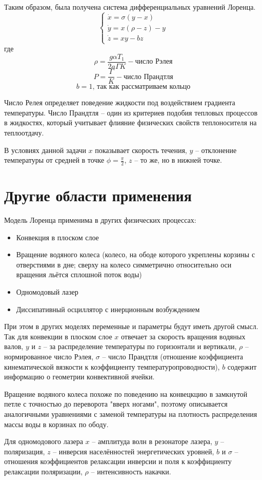 \documentclass[12pt]{article}
\begin{document}
Таким образом, была получена система дифференциальных уравнений Лоренца.
$$\begin{cases}	
	\dot{x} = \sigma (y-x) \\
	\dot{y} = x(\rho-z)-y \\
	\dot{z} = xy-bz
\end{cases}$$
где 
\[ \rho = \frac{g\alpha T_1}{2a\Gamma K} - \text{число Рэлея}\]
\[P = \frac{\Gamma}{K} - \text{число Прандтля}\] 
\[b = 1 \text{, так как рассматриваем кольцо}\]

Число Релея определяет поведение жидкости под воздействием градиента температуры. Число Прандтля -- один из критериев подобия тепловых процессов в жидкостях, который учитывает флияние физических свойств теплоносителя на теплоотдачу.

В условиях данной задачи $x$ показывает скорость течения, $y$ -- отклонение температуры от средней в точке $\phi = \frac{\pi}{2}$, $z$ -- то же, но в нижней точке.

\section{Другие области применения}

Модель Лоренца применима в других физических процессах:
\begin{itemize}
	\item Конвекция в плоском слое
	\item Вращение водяного колеса (колесо, на ободе которого укреплены корзины с отверстиями в дне; сверху на колесо симметрично относительно оси вращения льётся сплошной поток воды)
	\item Одномодовый лазер
	\item Диссипативный осциллятор с инерционным возбуждением
\end{itemize}

При этом в других моделях переменные и параметры будут иметь другой смысл. Так для конвекции в плоском слое $x$ отвечает за скорость вращения водяных валов, $y$ и $z$ -- за распределение температуры по горизонтали и вертикали, $\rho$ -- нормированное число Рэлея, $\sigma$ -- число Прандтля (отношение коэффициента кинематической вязкости к коэффициенту температуропроводности), $b$ содержит информацию о геометрии конвективной ячейки. 

Вращение водяного колеса похоже по поведению на конвецкцию в замкнутой петле с точностью до переворота "вверх ногами", поэтому описывается аналогичными уравнениями с заменой температуры на плотность распределения массы воды в корзинах по ободу.

Для одномодового лазера $x$ -- амплитуда волн в резонаторе лазера, $y$ -- поляризация, $z$ -- инверсия населённостей энергетических уровней, $b$ и $\sigma$ -- отношения коэффициентов релаксации инверсии и поля к коэффициенту релаксации поляризации, $\rho$ -- интенсивность накачки.
\end{document}
